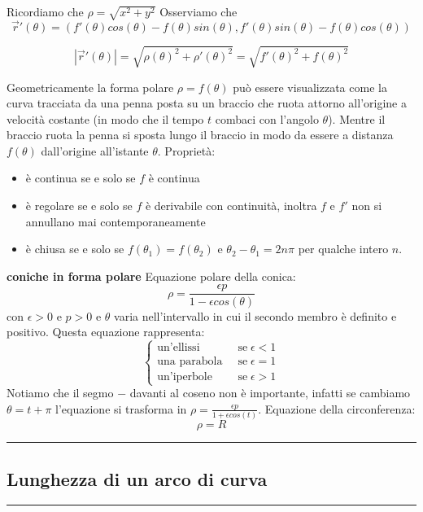 Ricordiamo che $\rho = \sqrt{x^2 + y^2}$
Osserviamo che 
\[
    \vec{r}'(\theta) = (f'(\theta) cos(\theta)- f(\theta)sin(\theta), f'(\theta) sin(\theta) - f(\theta)cos(\theta))
\]
\begin{tcolorbox}
\[
    |\vec{r}'(\theta)| = \sqrt{\rho(\theta)^2 + \rho'(\theta)^2} = \sqrt{f'(\theta)^2 + f(\theta)^2}
\]
\end{tcolorbox}
Geometricamente la forma polare $\rho = f(\theta)$ può essere visualizzata come la curva tracciata da una penna posta su un braccio che ruota attorno all'origine a velocità costante (in modo che il tempo $t$ combaci con l'angolo $\theta$). Mentre il braccio ruota la penna si sposta lungo il braccio in modo da essere a distanza $f(\theta)$ dall'origine all'istante $\theta$.\newline
\newline
Proprietà:
\begin{itemize}
    \item è continua se e solo se $f$ è continua
    \item è regolare se e solo se $f$ è derivabile con continuità, inoltra $f$ e $f'$ non si annullano mai contemporaneamente
    \item è chiusa se e solo se $f(\theta_1) = f(\theta_2)$ e $\theta_2 - \theta_1 = 2n\pi$ per qualche intero $n$.
\end{itemize}
\textbf{coniche in forma polare}\newline
Equazione polare della conica:
\[
        \rho = \frac{\epsilon p}{1- \epsilon cos(\theta)}
\]
con $\epsilon > 0$ e $p> 0$ e $\theta$ varia nell'intervallo in cui il secondo membro è definito e positivo.\newline
Questa equazione rappresenta:
\[
    \begin{cases}
        \text{un'ellissi} \;\; &\text{se} \; \epsilon< 1\\
        \text{una parabola} \;\; &\text{se} \; \epsilon= 1\\
        \text{un'iperbole} \;\; &\text{se} \; \epsilon> 1
    \end{cases}
\]
Notiamo che il segmo $-$ davanti al coseno non è importante, infatti se cambiamo $\theta = t + \pi$ l'equazione si trasforma in $\rho = \frac{\epsilon p}{1 + \epsilon cos(t)}$.\newline
Equazione della circonferenza:
\[
        \rho = R
\]
\rule{\textwidth}{2pt}
\subsection{Lunghezza di un arco di curva}
\rule{\textwidth}{0,4pt}
